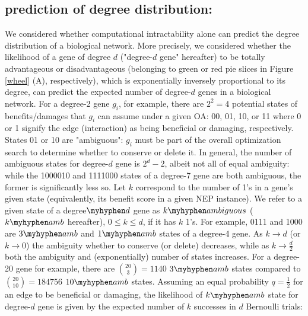 	\subsection{prediction of degree distribution:}\label{prediction_section}
			We considered whether computational intractability alone can predict the degree distribution of a biological network. More precisely, we considered whether the likelihood of a gene of degree $d$ ("degree-$d$ gene" hereafter) to be totally advantageous or disadvantageous (belonging to green or red pie slices in Figure \ref{wheel} (A), respectively), which is exponentially inversely proportional to its degree, can predict the expected number of degree-$d$ genes in a biological network.
			For a degree-2 gene $g_i$, for example, there are $2^2=4$ potential states of benefits/damages that $g_i$ can assume under a given OA: 00, 01, 10, or 11 where 0 or 1 signify the edge (interaction) as being  beneficial or damaging, respectively. States 01 or 10  are "ambiguous": $g_i$ must be part of the overall optimization search to determine whether to conserve or delete it. In general, the number of ambiguous states for degree-$d$  gene is $2^d - 2$, albeit not all of equal ambiguity: while the 1000010 and 1111000 states of a degree-7 gene are both ambiguous, the former is significantly less so. Let $k$ correspond to the number of 1's in a gene's given state (equivalently, its benefit score in a given NEP instance). We refer to a given state of a degree$\myhyphen d$ gene as $k\myhyphen ambiguous$ ($k\myhyphen amb$ hereafter), $0 \leq k \leq d$, if it has $k$ 1's. For example, 0111 and 1000 are  $3\myhyphen amb$ and $1\myhyphen amb$ states of a degree-4 gene. As $k\to d$ (or $k\to 0$) the ambiguity whether to conserve (or delete) decreases, while as $k\to \frac{d}{2}$ both the ambiguity and (exponentially) number of states increases.
			For a degree-20 gene for example, there are ${20 \choose 3} = 1140$ $3\myhyphen amb$ states compared to ${20 \choose 10}=184756$ $10\myhyphen amb$ states. Assuming an equal probability $q=\frac{1}{2}$ for an edge to be beneficial or damaging, the likelihood of $k\myhyphen amb$ state for degree-$d$ gene is given by the expected number of $k$ successes in $d$ Bernoulli trials:

